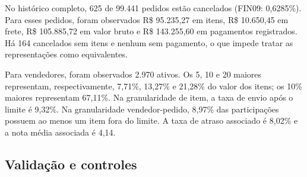 \documentclass[12pt,a4paper]{article}
\begin{document}
No histórico completo, 625 de 99.441 pedidos estão cancelados (FIN09:
0,6285\%). Para esses pedidos, foram observados R\$ 95.235,27 em itens,
R\$ 10.650,45 em frete, R\$ 105.885,72 em valor bruto e R\$ 143.255,60
em pagamentos registrados. Há 164 cancelados sem itens e nenhum sem
pagamento, o que impede tratar as representações como equivalentes.

Para vendedores, foram observados 2.970 ativos. Os 5, 10 e 20 maiores
representam, respectivamente, 7,71\%, 13,27\% e 21,28\% do valor dos
itens; os 10\% maiores representam 67,11\%. Na granularidade de item, a
taxa de envio após o limite é 9,32\%. Na granularidade vendedor-pedido,
8,97\% das participações possuem ao menos um item fora do limite. A taxa
de atraso associado é 8,02\% e a nota média associada é 4,14.

\subsection{Validação e
controles}\label{docs__analytics__catalogo_metricas_analiticas.md__validauxe7uxe3o-e-controles}
\end{document}
